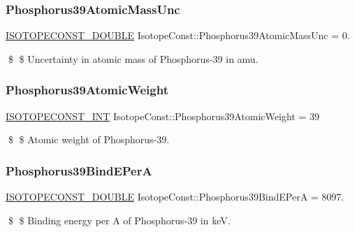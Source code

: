 \subsubsection{\texorpdfstring{Phosphorus39\+Atomic\+Mass\+Unc}{Phosphorus39AtomicMassUnc}}
{\footnotesize\ttfamily \mbox{\hyperlink{group___isotope_const-_macros_ga8f45a7272ce02c0b4c65c44636ed719a}{I\+S\+O\+T\+O\+P\+E\+C\+O\+N\+S\+T\+\_\+\+D\+O\+U\+B\+LE}} Isotope\+Const\+::\+Phosphorus39\+Atomic\+Mass\+Unc = 0.}

\$ \$ Uncertainty in atomic mass of Phosphorus-\/39 in amu. \mbox{\label{group___isotope_const-_phosphorus-_p39_ga41d8ab8dd52d18372e84577f69b89841}} 
\subsubsection{\texorpdfstring{Phosphorus39\+Atomic\+Weight}{Phosphorus39AtomicWeight}}
{\footnotesize\ttfamily \mbox{\hyperlink{group___isotope_const-_macros_ga5f18360b3e99483a35c32d789e62621c}{I\+S\+O\+T\+O\+P\+E\+C\+O\+N\+S\+T\+\_\+\+I\+NT}} Isotope\+Const\+::\+Phosphorus39\+Atomic\+Weight = 39}

\$ \$ Atomic weight of Phosphorus-\/39. \mbox{\label{group___isotope_const-_phosphorus-_p39_gaef11cde5dd7e0d20d37926b52b0ccd9b}} 
\subsubsection{\texorpdfstring{Phosphorus39\+Bind\+E\+PerA}{Phosphorus39BindEPerA}}
{\footnotesize\ttfamily \mbox{\hyperlink{group___isotope_const-_macros_ga8f45a7272ce02c0b4c65c44636ed719a}{I\+S\+O\+T\+O\+P\+E\+C\+O\+N\+S\+T\+\_\+\+D\+O\+U\+B\+LE}} Isotope\+Const\+::\+Phosphorus39\+Bind\+E\+PerA = 8097.}

\$ \$ Binding energy per A of Phosphorus-\/39 in keV. \mbox{\label{group___isotope_const-_phosphorus-_p39_ga636f79f7962c509574ac59da85d37cea}} 
